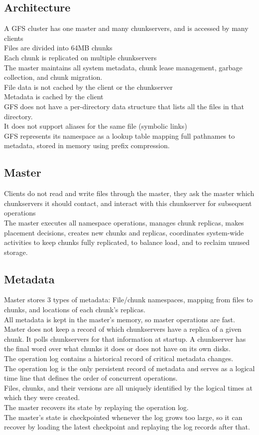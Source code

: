 \subsection{Architecture}
A GFS cluster has one master and many chunkservers, and is accessed by many clients\\
Files are divided into 64MB chunks\\
Each chunk is replicated on multiple chunkservers\\
The master maintains all system metadata, chunk lease management, garbage collection, and chunk migration. \\
File data is not cached by the client or the chunkserver\\
Metadata is cached by the client\\
GFS does not have a per-directory data structure that lists all the files in that directory.\\
It does not support aliases for the same file (symbolic links)\\
GFS represents its namespace as a lookup table mapping full pathnames to metadata, stored in memory using prefix compression.
\subsection{Master}
Clients do not read and write files through the master, they ask the master which chunkservers it should contact, and interact with this chunkserver for subsequent operations\\
The master executes all namespace operations, manages chunk replicas, makes placement decisions, creates new chunks and replicas, coordinates system-wide activities to keep chunks fully replicated, to balance load, and to reclaim unused storage.
\subsection{Metadata}
Master stores 3 types of metadata: File/chunk namespaces, mapping from files to chunks, and locations of each chunk's replicas.\\
All metadata is kept in the master's memory, so master operations are fast.\\
Master does not keep a record of which chunkservers have a replica of a given chunk. It polls chunkservers for that information at startup. A chunkserver has the final word over what chunks it does or does not have on its own disks.\\
The operation log contains a historical record of critical metadata changes. \\
The operation log is the only persistent record of metadata and serves as a logical time line that defines the order of concurrent operations. \\
Files, chunks, and their versions are all uniquely identified by the logical times at which they were created. \\
The master recovers its state by replaying the operation log. \\
The master's state is checkpointed whenever the log grows too large, so it can recover by loading the latest checkpoint and replaying the log records after that.
